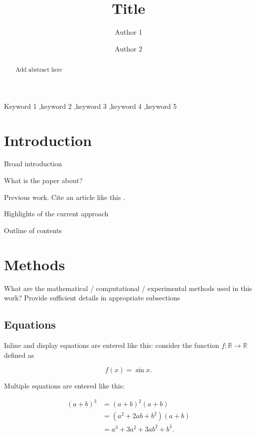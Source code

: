 \documentclass[11pt,review]{elsarticle}
\begin{document}
\begin{frontmatter}

\title{Title}
\author{Author 1}
\address[ShortName]{Name of institution}
\author{Author 2}
\address[ShortName]{Name of institution}


\begin{abstract}
Add abstract here
\end{abstract}

\begin{keyword}
Keyword 1 \sep keyword 2 \sep keyword 3 \sep keyword 4 \sep keyword 5
\end{keyword}

\end{frontmatter}


\section{Introduction}
Broad introduction

What is the paper about?

Previous work. Cite an article like this \cite{KO16}.

Highlights of the current approach

Outline of contents

\section{Methods} \label{sec:methods}

What are the mathematical / computational / experimental methods used in this work? Provide sufficient details in appropriate subsections

\subsection{Equations}

Inline and display equations are entered like this: consider the function $f:\mathbb{R} \to \mathbb{R}$ defined as

\begin{equation} \label{eq:fn_defn}
f(x) = \sin x.
\end{equation}

Multiple equations are entered like this:

\begin{equation} \label{eq:mult_eqns}
\begin{split}
(a + b)^3 &= (a + b)^2(a + b)\\
 &= (a^2 + 2ab + b^2)(a + b)\\
 &= a^3 + 3a^2 + 3ab^2 + b^3.
\end{split}
\end{equation}
\end{document}
